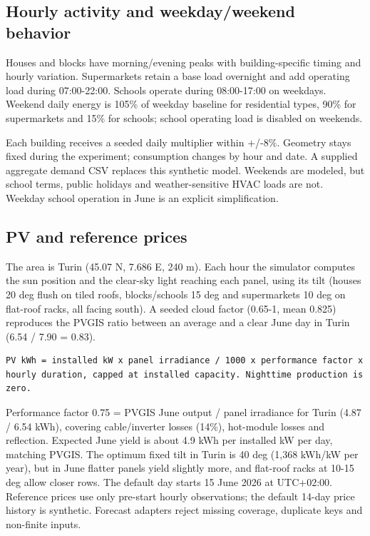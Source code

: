 \documentclass[a4paper,11pt]{article}
\begin{document}
\subsection*{Hourly activity and weekday/weekend behavior}
\par\medskip

Houses and blocks have morning/evening peaks with building-specific timing and hourly variation. Supermarkets retain a base load overnight and add operating load during 07:00-22:00. Schools operate during 08:00-17:00 on weekdays. Weekend daily energy is 105\% of weekday baseline for residential types, 90\% for supermarkets and 15\% for schools; school operating load is disabled on weekends.
\par\medskip

Each building receives a seeded daily multiplier within +/-8\%. Geometry stays fixed during the experiment; consumption changes by hour and date. A supplied aggregate demand CSV replaces this synthetic model. Weekends are modeled, but school terms, public holidays and weather-sensitive HVAC loads are not. Weekday school operation in June is an explicit simplification.
\par\medskip

\subsection*{PV and reference prices}
\par\medskip

The area is Turin (45.07 N, 7.686 E, 240 m). Each hour the simulator computes the sun position and the clear-sky light reaching each panel, using its tilt (houses 20 deg flush on tiled roofs, blocks/schools 15 deg and supermarkets 10 deg on flat-roof racks, all facing south). A seeded cloud factor (0.65-1, mean 0.825) reproduces the PVGIS ratio between an average and a clear June day in Turin (6.54 / 7.90 = 0.83).
\par\medskip

\begin{lstlisting}
PV kWh = installed kW x panel irradiance / 1000 x performance factor x hourly duration, capped at installed capacity. Nighttime production is zero.
\end{lstlisting}

Performance factor 0.75 = PVGIS June output / panel irradiance for Turin (4.87 / 6.54 kWh), covering cable/inverter losses (14\%), hot-module losses and reflection. Expected June yield is about 4.9 kWh per installed kW per day, matching PVGIS. The optimum fixed tilt in Turin is 40 deg (1,368 kWh/kW per year), but in June flatter panels yield slightly more, and flat-roof racks at 10-15 deg allow closer rows. The default day starts 15 June 2026 at UTC+02:00. Reference prices use only pre-start hourly observations; the default 14-day price history is synthetic. Forecast adapters reject missing coverage, duplicate keys and non-finite inputs.
\par\medskip
\end{document}
